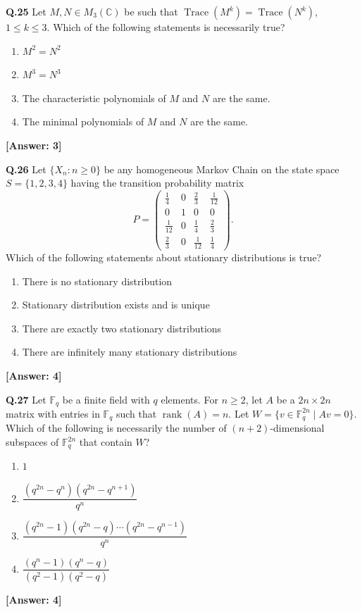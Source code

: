\documentclass[12pt,a4paper]{article}
\newcommand{\ans}[1]{\quad\textcolor{anscolor}{\textbf{[Answer: #1]}}}
\begin{document}
\textbf{Q.25} Let $M,N\in M_3(\mathbb{C})$ be such that $\operatorname{Trace}(M^k)=\operatorname{Trace}(N^k)$, $1\le k\le3$. Which of the following statements is necessarily true?
\begin{enumerate}[label=\arabic*.]
\item $M^2=N^2$ \item $M^3=N^3$
\item The characteristic polynomials of $M$ and $N$ are the same.
\item The minimal polynomials of $M$ and $N$ are the same.
\end{enumerate}\ans{3}

\textbf{Q.26} Let $\{X_n:n\ge0\}$ be any homogeneous Markov Chain on the state space $S=\{1,2,3,4\}$ having the transition probability matrix
\[P=\begin{pmatrix}\tfrac{1}{4}&0&\tfrac{2}{3}&\tfrac{1}{12}\\0&1&0&0\\\tfrac{1}{12}&0&\tfrac{1}{4}&\tfrac{2}{3}\\\tfrac{2}{3}&0&\tfrac{1}{12}&\tfrac{1}{4}\end{pmatrix}.\]
Which of the following statements about stationary distributions is true?
\begin{enumerate}[label=\arabic*.]
\item There is no stationary distribution \item Stationary distribution exists and is unique
\item There are exactly two stationary distributions \item There are infinitely many stationary distributions
\end{enumerate}\ans{4}

\textbf{Q.27} Let $\mathbb{F}_q$ be a finite field with $q$ elements. For $n\ge2$, let $A$ be a $2n\times2n$ matrix with entries in $\mathbb{F}_q$ such that $\operatorname{rank}(A)=n$. Let $W=\{v\in\mathbb{F}_q^{2n}\mid Av=0\}$. Which of the following is necessarily the number of $(n+2)$-dimensional subspaces of $\mathbb{F}_q^{2n}$ that contain $W$?
\begin{enumerate}[label=\arabic*.]
\item $1$
\item $\dfrac{(q^{2n}-q^n)(q^{2n}-q^{n+1})}{q^n}$
\item $\dfrac{(q^{2n}-1)(q^{2n}-q)\cdots(q^{2n}-q^{n-1})}{q^n}$
\item $\dfrac{(q^n-1)(q^n-q)}{(q^2-1)(q^2-q)}$
\end{enumerate}\ans{4}
\end{document}
